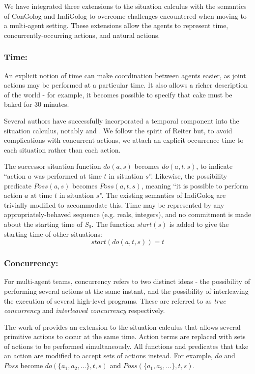 \documentclass[letterpaper]{article}
\begin{document}
We have integrated three extensions to the situation calculus with the
semantics of ConGolog and IndiGolog to overcome
challenges encountered when moving to a multi-agent setting.  These
extensions allow the agents to represent time, concurrently-occurring actions,
and natural actions.

\subsubsection{Time:}
An explicit notion of time can make coordination between agents
easier, as joint actions may be performed at a particular time.  It
also allows a richer description of the world - for example, it becomes possible
to specify that cake must be baked for 30 minutes.

Several authors have successfully incorporated a temporal component
into the situation calculus, notably \cite{pinto94temporal} and
\cite{reiter96sc_nat_conc}.  We follow the spirit of Reiter but, to
avoid complications with concurrent actions, we attach an explicit 
occurrence time to each situation rather than each action.

The successor situation function $do(a,s)$
becomes $do(a,t,s)$, to indicate ``action $a$ was performed at
time $t$ in situation $s$''. Likewise, the possibility predicate
$Poss(a,s)$ becomes $Poss(a,t,s)$, meaning ``it is possible to
perform action $a$ at time $t$ in situation $s$''.  The existing semantics
of IndiGolog are trivially modified to accommodate this.
Time may be represented by any appropriately-behaved sequence (e.g. reals,
integers), and no commitment is made about the starting time of $S_0$.
The function $start(s)$ is added to give the starting time of other situations:
\begin{equation}
\label{eqn:sit_start}
start(do(a,t,s))=t
\end{equation}

\subsubsection{Concurrency:} 
For multi-agent teams, concurrency refers to two distinct ideas -
the possibility of performing several actions at the same instant,
and the possibility of interleaving the execution of several high-level
programs. These are referred to as \emph{true concurrency} and \emph{interleaved
concurrency} respectively.

The work of \cite{lin92sc_conc,reiter96sc_nat_conc} provides an extension
to the situation calculus that allows several primitive actions to
occur at the same time. Action terms are replaced with sets of actions
to be performed simultaneously. All functions and predicates that
take an action are modified to accept sets of actions instead. For
example, $do$ and $Poss$ become $do(\{ a_{1},a_{2},...\},t,s)$
and $Poss(\{ a_{1},a_{2},...\},t,s)$.
\end{document}
